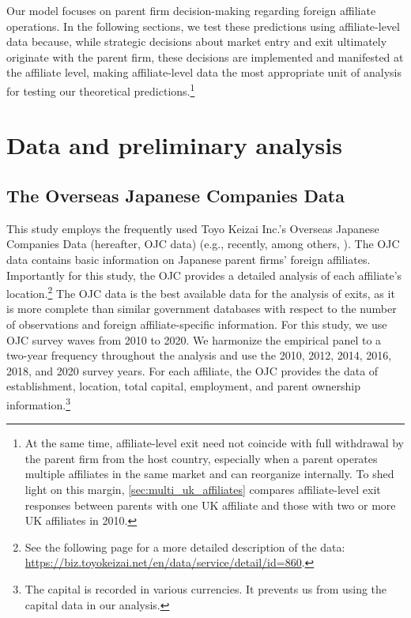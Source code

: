\documentclass[preprint,11pt,authoryear]{elsarticle}
\begin{document}
Our model focuses on parent firm decision-making regarding foreign affiliate operations. In the following sections, we test these predictions using affiliate-level data because, while strategic decisions about market entry and exit ultimately originate with the parent firm, these decisions are implemented and manifested at the affiliate level, making affiliate-level data the most appropriate unit of analysis for testing our theoretical predictions.\footnote{At the same time, affiliate-level exit need not coincide with full withdrawal by the parent firm from the host country, especially when a parent operates multiple affiliates in the same market and can reorganize internally. To shed light on this margin, \ref{sec:multi_uk_affiliates} compares affiliate-level exit responses between parents with one UK affiliate and those with two or more UK affiliates in 2010.}




\section{Data and preliminary analysis \label{sec:data}}
\subsection{The Overseas Japanese Companies Data}

This study employs the frequently used Toyo Keizai Inc.'s Overseas Japanese Companies Data (hereafter, OJC data) (e.g., recently, among others, \citealt{Bederbos2021, cieslik2022brexit}). The OJC data contains basic information on Japanese parent firms' foreign affiliates. Importantly for this study, the OJC provides a detailed analysis of each affiliate's location.\footnote{See the following page for a more detailed description of the data: \url{https://biz.toyokeizai.net/en/data/service/detail/id=860}.} The OJC data is the best available data for the analysis of exits, as it is more complete than similar government databases with respect to the number of observations and foreign affiliate-specific information. 
For this study, we use OJC survey waves from 2010 to 2020. We harmonize the empirical panel to a two-year frequency throughout the analysis and use the 2010, 2012, 2014, 2016, 2018, and 2020 survey years. For each affiliate, the OJC provides the data of establishment, location, total capital, employment, and parent ownership information.\footnote{The capital is recorded in various currencies. It prevents us from using the capital data in our analysis.}
\end{document}
